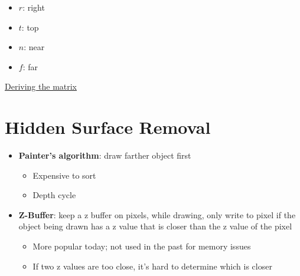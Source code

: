       \begin{itemize}
        \item $ r $: right
        \item $ t $: top
        \item $ n $: near
        \item $ f $: far
      \end{itemize}

      \href{http://www.songho.ca/opengl/gl_projectionmatrix.html}{Deriving
      the matrix}

\section{Hidden Surface Removal}

  \begin{itemize}
    \item \textbf{Painter's algorithm}: draw farther object first
    \begin{itemize}
      \item Expensive to sort
      \item Depth cycle
    \end{itemize}

    \item \textbf{Z-Buffer}: keep a z buffer on pixels, while drawing,
    only write to pixel if the object being drawn has a z value that is
    closer than the z value of the pixel
    \begin{itemize}
      \item More popular today; not used in the past for memory issues
      \item If two z values are too close, it's hard to determine which is
      closer
    \end{itemize}
  \end{itemize}
